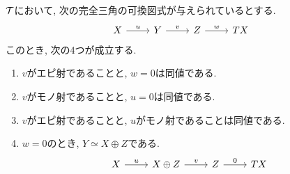 \documentclass[uplatex, a4paper, 14Q, dvipdfmx]{jsarticle}
\begin{document}
\begin{corollary} \label{auto_split}
  $\mathcal{T}$において, 次の完全三角の可換図式が与えられているとする. 
  \[\begin{tikzcd}
    X & Y & Z & TX
    \arrow["u", from=1-1, to=1-2]
    \arrow["v", from=1-2, to=1-3]
    \arrow["w", from=1-3, to=1-4]
  \end{tikzcd}\] 
  このとき, 次の4つが成立する. 
  \begin{enumerate}
    \item $v$がエピ射であることと, $w=0$は同値である. 
    \item $v$がモノ射であることと, $u=0$は同値である. 
    \item $v$がエピ射であることと, $u$がモノ射であることは同値である. 
    \item $w=0$のとき, $Y \simeq X \oplus Z$である. 
    \[\begin{tikzcd}
      X & {X \oplus Z} & Z & TX
      \arrow["u", from=1-1, to=1-2]
      \arrow["v", from=1-2, to=1-3]
      \arrow["0", from=1-3, to=1-4]
    \end{tikzcd}\] 
  \end{enumerate}
\end{corollary}
\end{document}
